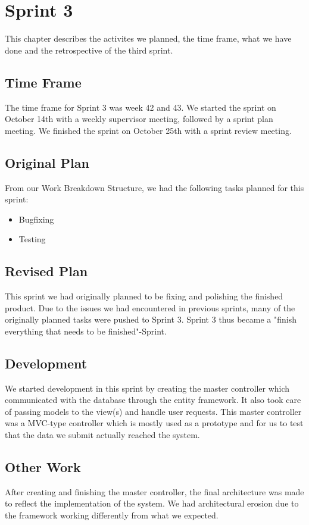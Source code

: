 \chapter{Sprint 3}
This chapter describes the activites we planned, the time frame, what we have done and the retrospective of the third sprint. 
\newpage 

\section{Time Frame}
The time frame for Sprint 3 was week 42 and 43. We started the sprint on October 14th with a weekly supervisor meeting, followed by a sprint plan meeting. We finished the sprint on October 25th with a sprint review meeting.

\section{Original Plan}
From our Work Breakdown Structure, we had the following tasks planned for this sprint:
\begin{itemize}
	\item Bugfixing
	\item Testing
\end{itemize}

\section{Revised Plan}
This sprint we had originally planned to be fixing and polishing the finished product. Due to the issues we had encountered in previous sprints, many of the originally planned tasks were pushed to Sprint 3. Sprint 3 thus became a "finish everything that needs to be finished"-Sprint.

\section{Development}
We started development in this sprint by creating the master controller which communicated with the database through the entity framework. It also took care of passing models to the view(s) and handle user requests. This master controller was a MVC-type controller which is mostly used as a prototype and for us to test that the data we submit actually reached the system.

\section{Other Work}
After creating and finishing the master controller, the final architecture was made to reflect the implementation of the system. We had architectural erosion due to the framework working differently from what we expected.

